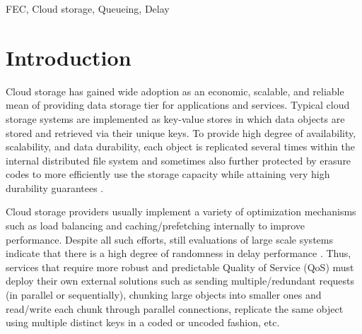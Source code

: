 \documentclass[journal]{IEEEtran}
\newcommand{\comment}[1]{}
\newcommand{\ourscheme}{TOFEC\xspace}
\begin{document}
\begin{abstract}
\comment{
\ourscheme is a strategy that helps front-end proxy adapt to different levels of workload by treating scalable cloud storage (e.g. Amazon S3) as a shared resource requiring admission control. Under light workloads, \ourscheme creates more smaller chunks and uses more parallel connections per file, minimizing service delay. Under heavy workloads, \ourscheme automatically reduces the level of chunking (fewer chunks with increased size) and uses fewer parallel connections to reduce overhead, resulting in higher throughput and preventing queueing delay. Our trace-driven simulation results show that \ourscheme's adaptation mechanism converges to an appropriate code that provides the optimal throughput-delay trade-off without reducing system capacity. Compared to a non-adaptive strategy optimized for throughput, \ourscheme delivers  lower latency under light workloads; compared to a non-adaptive strategy optimized for latency, \ourscheme can scale to support over  as many requests.
}
\end{abstract}


\begin{IEEEkeywords}
FEC, Cloud storage, Queueing, Delay
\end{IEEEkeywords}


\IEEEpeerreviewmaketitle

\section{Introduction}
\label{sec:intro}

Cloud storage has gained wide adoption as an economic, scalable, and reliable mean of providing data storage tier for applications and services. 
Typical cloud storage systems are implemented as key-value stores in which data objects are stored and retrieved via their unique keys. To provide high degree of availability, scalability, and data durability, each object is replicated several times within the internal distributed file system and sometimes also further protected by erasure codes to more efficiently use the storage capacity while attaining very high durability guarantees \cite{Huang12}. 

Cloud storage providers usually implement a variety of optimization mechanisms such as load balancing and caching/prefetching internally to improve performance. Despite all such efforts, still evaluations of large scale systems indicate that there is a high degree of randomness in delay performance \cite{Garfinkel07anevaluation}. 
Thus, services that require more robust and predictable Quality of Service (QoS) must deploy their own external solutions such as sending multiple/redundant requests (in parallel or sequentially), chunking large objects into smaller ones and read/write each chunk through parallel connections, replicate the same object using multiple distinct keys in a coded or uncoded fashion, etc.
\end{document}
